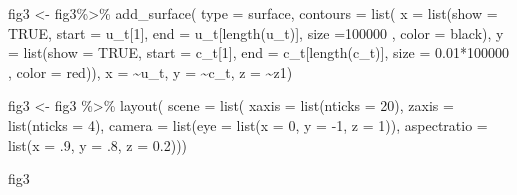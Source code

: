 \documentclass[
  us-letterpaper,
]{scrreprt}
\newenvironment{Shaded}{\begin{snugshade}}{\end{snugshade}}
\newcommand{\AttributeTok}[1]{\textcolor[rgb]{0.40,0.45,0.13}{#1}}
\newcommand{\ConstantTok}[1]{\textcolor[rgb]{0.56,0.35,0.01}{#1}}
\newcommand{\DecValTok}[1]{\textcolor[rgb]{0.68,0.00,0.00}{#1}}
\newcommand{\FloatTok}[1]{\textcolor[rgb]{0.68,0.00,0.00}{#1}}
\newcommand{\FunctionTok}[1]{\textcolor[rgb]{0.28,0.35,0.67}{#1}}
\newcommand{\NormalTok}[1]{\textcolor[rgb]{0.00,0.23,0.31}{#1}}
\newcommand{\OtherTok}[1]{\textcolor[rgb]{0.00,0.23,0.31}{#1}}
\newcommand{\SpecialCharTok}[1]{\textcolor[rgb]{0.37,0.37,0.37}{#1}}
\newcommand{\StringTok}[1]{\textcolor[rgb]{0.13,0.47,0.30}{#1}}
\theoremstyle{definition}
\theoremstyle{plain}
\theoremstyle{plain}
\theoremstyle{remark}
\begin{document}
\begin{Shaded}
\begin{Highlighting}[]
\NormalTok{fig3 }\OtherTok{\textless{}{-}}\NormalTok{ fig3}\SpecialCharTok{\%\textgreater{}\%} \FunctionTok{add\_surface}\NormalTok{(}
  \AttributeTok{type =} \StringTok{\textquotesingle{}surface\textquotesingle{}}\NormalTok{,}
  \AttributeTok{contours =} \FunctionTok{list}\NormalTok{(}
    \AttributeTok{x =} \FunctionTok{list}\NormalTok{(}\AttributeTok{show =} \ConstantTok{TRUE}\NormalTok{, }\AttributeTok{start =}\NormalTok{ u\_t[}\DecValTok{1}\NormalTok{], }
             \AttributeTok{end =}\NormalTok{ u\_t[}\FunctionTok{length}\NormalTok{(u\_t)], }\AttributeTok{size =}\DecValTok{100000}\NormalTok{ ,}
             \AttributeTok{color =} \StringTok{\textquotesingle{}black\textquotesingle{}}\NormalTok{),}
    \AttributeTok{y =} \FunctionTok{list}\NormalTok{(}\AttributeTok{show =} \ConstantTok{TRUE}\NormalTok{, }\AttributeTok{start =}\NormalTok{ c\_t[}\DecValTok{1}\NormalTok{], }
             \AttributeTok{end =}\NormalTok{ c\_t[}\FunctionTok{length}\NormalTok{(c\_t)], }
             \AttributeTok{size =} \FloatTok{0.01}\SpecialCharTok{*}\DecValTok{100000}\NormalTok{ , }\AttributeTok{color =} \StringTok{\textquotesingle{}red\textquotesingle{}}\NormalTok{)),}
  \AttributeTok{x =} \SpecialCharTok{\textasciitilde{}}\NormalTok{u\_t,}
  \AttributeTok{y =} \SpecialCharTok{\textasciitilde{}}\NormalTok{c\_t,}
  \AttributeTok{z =} \SpecialCharTok{\textasciitilde{}}\NormalTok{z1)}

\NormalTok{fig3 }\OtherTok{\textless{}{-}}\NormalTok{ fig3 }\SpecialCharTok{\%\textgreater{}\%} \FunctionTok{layout}\NormalTok{(}
  \AttributeTok{scene =} \FunctionTok{list}\NormalTok{(}
    \AttributeTok{xaxis =} \FunctionTok{list}\NormalTok{(}\AttributeTok{nticks =} \DecValTok{20}\NormalTok{),}
    \AttributeTok{zaxis =} \FunctionTok{list}\NormalTok{(}\AttributeTok{nticks =} \DecValTok{4}\NormalTok{),}
    \AttributeTok{camera =} \FunctionTok{list}\NormalTok{(}\AttributeTok{eye =} \FunctionTok{list}\NormalTok{(}\AttributeTok{x =} \DecValTok{0}\NormalTok{, }\AttributeTok{y =} \SpecialCharTok{{-}}\DecValTok{1}\NormalTok{, }\AttributeTok{z =} \DecValTok{1}\NormalTok{)),}
    \AttributeTok{aspectratio =} \FunctionTok{list}\NormalTok{(}\AttributeTok{x =}\NormalTok{ .}\DecValTok{9}\NormalTok{, }\AttributeTok{y =}\NormalTok{ .}\DecValTok{8}\NormalTok{, }\AttributeTok{z =} \FloatTok{0.2}\NormalTok{)))}


\NormalTok{fig3}
\end{Highlighting}
\end{Shaded}
\end{document}
